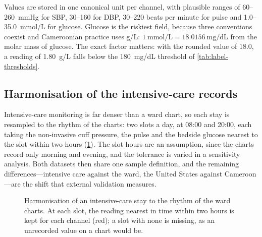 \documentclass[11pt,a4paper,oneside]{report}
\begin{document}
Values are stored in one canonical unit per channel, with plausible ranges of 60--260~mmHg for SBP, 30--160 for DBP, 30--220 beats per minute for pulse and 1.0--35.0~mmol/L for glucose. Glucose is the riskiest field, because three conventions coexist and Cameroonian practice uses g/L: $1~\text{mmol/L} = 18.0156~\text{mg/dL}$ from the molar mass of glucose. The exact factor matters: with the rounded value of 18.0, a reading of 1.80~g/L falls below the 180~mg/dL threshold of \cref{tab:label-thresholds}.

\subsection{Harmonisation of the intensive-care records}\label{sec:harmonisation}

Intensive-care monitoring is far denser than a ward chart, so each stay is resampled to the rhythm of the charts: two slots a day, at 08:00 and 20:00, each taking the non-invasive cuff pressure, the pulse and the bedside glucose nearest to the slot within two hours (\cref{fig:harmonisation}). The slot hours are an assumption, since the charts record only morning and evening, and the tolerance is varied in a sensitivity analysis. Both datasets then share one sample definition, and the remaining differences---intensive care against the ward, the United States against Cameroon---are the shift that external validation measures.

\begin{figure}[htbp]
\centering
{}
\caption{Harmonisation of an intensive-care stay to the rhythm of the ward charts. At each slot, the reading nearest in time within two hours is kept for each channel (red); a slot with none is missing, as an unrecorded value on a chart would be.}\label{fig:harmonisation}
\end{figure}
\end{document}
